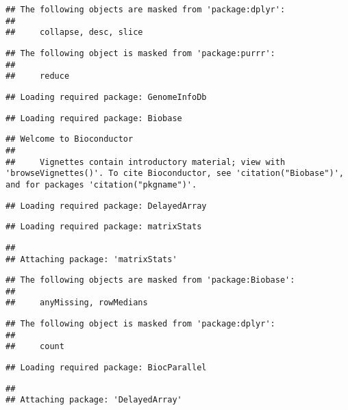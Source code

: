 \documentclass[]{article}
\begin{document}
\begin{verbatim}
## The following objects are masked from 'package:dplyr':
## 
##     collapse, desc, slice
\end{verbatim}

\begin{verbatim}
## The following object is masked from 'package:purrr':
## 
##     reduce
\end{verbatim}

\begin{verbatim}
## Loading required package: GenomeInfoDb
\end{verbatim}

\begin{verbatim}
## Loading required package: Biobase
\end{verbatim}

\begin{verbatim}
## Welcome to Bioconductor
## 
##     Vignettes contain introductory material; view with 'browseVignettes()'. To cite Bioconductor, see 'citation("Biobase")', and for packages 'citation("pkgname")'.
\end{verbatim}

\begin{verbatim}
## Loading required package: DelayedArray
\end{verbatim}

\begin{verbatim}
## Loading required package: matrixStats
\end{verbatim}

\begin{verbatim}
## 
## Attaching package: 'matrixStats'
\end{verbatim}

\begin{verbatim}
## The following objects are masked from 'package:Biobase':
## 
##     anyMissing, rowMedians
\end{verbatim}

\begin{verbatim}
## The following object is masked from 'package:dplyr':
## 
##     count
\end{verbatim}

\begin{verbatim}
## Loading required package: BiocParallel
\end{verbatim}

\begin{verbatim}
## 
## Attaching package: 'DelayedArray'
\end{verbatim}
\end{document}
